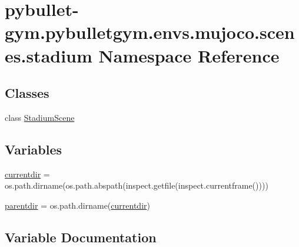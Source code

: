 \hypertarget{namespacepybullet-gym_1_1pybulletgym_1_1envs_1_1mujoco_1_1scenes_1_1stadium}{}\section{pybullet-\/gym.pybulletgym.\+envs.\+mujoco.\+scenes.\+stadium Namespace Reference}
\label{namespacepybullet-gym_1_1pybulletgym_1_1envs_1_1mujoco_1_1scenes_1_1stadium}
\subsection*{Classes}
\begin{DoxyCompactItemize}
\item 
class \hyperlink{classpybullet-gym_1_1pybulletgym_1_1envs_1_1mujoco_1_1scenes_1_1stadium_1_1_stadium_scene}{Stadium\+Scene}
\end{DoxyCompactItemize}
\subsection*{Variables}
\begin{DoxyCompactItemize}
\item 
\hyperlink{namespacepybullet-gym_1_1pybulletgym_1_1envs_1_1mujoco_1_1scenes_1_1stadium_ad81996da0d592e915f52bce205734e49}{currentdir} = os.\+path.\+dirname(os.\+path.\+abspath(inspect.\+getfile(inspect.\+currentframe())))
\item 
\hyperlink{namespacepybullet-gym_1_1pybulletgym_1_1envs_1_1mujoco_1_1scenes_1_1stadium_ac19c0021f12c470143f997177931a336}{parentdir} = os.\+path.\+dirname(\hyperlink{namespacepybullet-gym_1_1pybulletgym_1_1envs_1_1mujoco_1_1scenes_1_1stadium_ad81996da0d592e915f52bce205734e49}{currentdir})
\end{DoxyCompactItemize}


\subsection{Variable Documentation}
